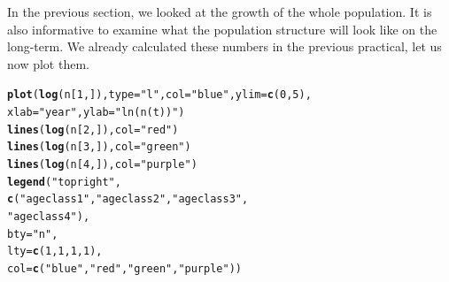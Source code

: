 \documentclass{article}\usepackage[]{graphicx}\usepackage[]{color}
\makeatletter
\newcommand{\hlnum}[1]{\textcolor[rgb]{0.686,0.059,0.569}{#1}}%
\newcommand{\hlstr}[1]{\textcolor[rgb]{0.192,0.494,0.8}{#1}}%
\newcommand{\hlstd}[1]{\textcolor[rgb]{0.345,0.345,0.345}{#1}}%
\newcommand{\hlkwc}[1]{\textcolor[rgb]{0.333,0.667,0.333}{#1}}%
\newcommand{\hlkwd}[1]{\textcolor[rgb]{0.737,0.353,0.396}{\textbf{#1}}}%
\newenvironment{kframe}{%
 \def\at@end@of@kframe{}%
 \ifinner\ifhmode%
  \def\at@end@of@kframe{\end{minipage}}%
  \begin{minipage}{\columnwidth}%
 \fi\fi%
 \def\FrameCommand##1{\hskip\@totalleftmargin \hskip-\fboxsep
 \colorbox{shadecolor}{##1}\hskip-\fboxsep
     \hskip-\linewidth \hskip-\@totalleftmargin \hskip\columnwidth}%
 \MakeFramed {\advance\hsize-\width
   \@totalleftmargin\z@ \linewidth\hsize
   \@setminipage}}%
 {\par\unskip\endMakeFramed%
 \at@end@of@kframe}
\newenvironment{knitrout}{}{} %
\makeatother
\begin{document}
In the previous section, we looked at the growth of the whole population. It is also informative to examine what the population structure will look like on the long-term. We already calculated these numbers in the previous practical, let us now plot them. 
\begin{knitrout}
\color{fgcolor}\begin{kframe}
\begin{alltt}
\hlkwd{plot}\hlstd{(}\hlkwd{log}\hlstd{(n[}\hlnum{1}\hlstd{,]),} \hlkwc{type}\hlstd{=}\hlstr{"l"}\hlstd{,} \hlkwc{col}\hlstd{=}\hlstr{"blue"}\hlstd{,} \hlkwc{ylim}\hlstd{=}\hlkwd{c}\hlstd{(}\hlnum{0}\hlstd{,}\hlnum{5}\hlstd{),}
     \hlkwc{xlab}\hlstd{=}\hlstr{"year"}\hlstd{,} \hlkwc{ylab}\hlstd{=}\hlstr{"ln(n(t))"}\hlstd{)}
\hlkwd{lines}\hlstd{(}\hlkwd{log}\hlstd{(n[}\hlnum{2}\hlstd{,]),} \hlkwc{col}\hlstd{=}\hlstr{"red"}\hlstd{)}
\hlkwd{lines}\hlstd{(}\hlkwd{log}\hlstd{(n[}\hlnum{3}\hlstd{,]),} \hlkwc{col}\hlstd{=}\hlstr{"green"}\hlstd{)}
\hlkwd{lines}\hlstd{(}\hlkwd{log}\hlstd{(n[}\hlnum{4}\hlstd{,]),} \hlkwc{col}\hlstd{=}\hlstr{"purple"}\hlstd{)}
\hlkwd{legend}\hlstd{(}\hlstr{"topright"}\hlstd{,}
       \hlkwd{c}\hlstd{(}\hlstr{"age class 1 "}\hlstd{,}\hlstr{"age class 2"}\hlstd{,} \hlstr{"age class 3"}\hlstd{,}
         \hlstr{"age class 4"}\hlstd{),}
       \hlkwc{bty} \hlstd{=} \hlstr{"n"}\hlstd{,}
\hlkwc{lty}\hlstd{=}\hlkwd{c}\hlstd{(}\hlnum{1}\hlstd{,}\hlnum{1}\hlstd{,}\hlnum{1}\hlstd{,}\hlnum{1}\hlstd{),}
\hlkwc{col}\hlstd{=}\hlkwd{c}\hlstd{(}\hlstr{"blue"}\hlstd{,} \hlstr{"red"}\hlstd{,} \hlstr{"green"}\hlstd{,} \hlstr{"purple"}\hlstd{))}
\end{alltt}
\end{kframe}
\end{knitrout}
\end{document}
